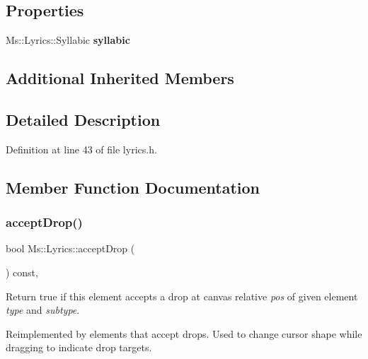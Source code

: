 \subsection*{Properties}
\begin{DoxyCompactItemize}
\item 
\mbox{\label{class_ms_1_1_lyrics_a0fd35fa90cab951bcd5b7713de4188a5}} 
Ms\+::\+Lyrics\+::\+Syllabic {\bfseries syllabic}
\end{DoxyCompactItemize}
\subsection*{Additional Inherited Members}


\subsection{Detailed Description}


Definition at line 43 of file lyrics.\+h.



\subsection{Member Function Documentation}
\mbox{\label{class_ms_1_1_lyrics_ac43270be909641564ad6ded9af47cafa}} 
\subsubsection{\texorpdfstring{accept\+Drop()}{acceptDrop()}}
{\footnotesize\ttfamily bool Ms\+::\+Lyrics\+::accept\+Drop (\begin{DoxyParamCaption}\item[{\hyperlink{class_ms_1_1_edit_data}{Edit\+Data} \&}]{ }\end{DoxyParamCaption}) const\hspace{0.3cm}{\ttfamily [override]}, {\ttfamily [virtual]}}

Return true if this element accepts a drop at canvas relative {\itshape pos} of given element {\itshape type} and {\itshape subtype}.

Reimplemented by elements that accept drops. Used to change cursor shape while dragging to indicate drop targets. 

